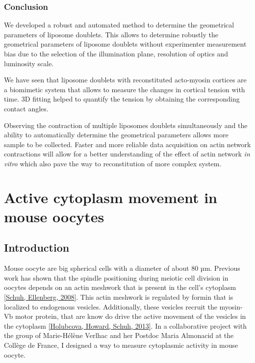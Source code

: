 \documentclass[A4paperpaper,11pt,english]{sphinxmanual}
\begin{document}
\subsection{Conclusion}
\label{index-latex:id25}
We developed a robust and automated method to determine the geometrical
parameters of liposome doublets. This allows to determine robustly the
geometrical parameters of liposome doublets without
experimenter measurement bias due to the selection of the illumination plane,
resolution of optics and luminosity scale.

We have seen that liposome doublets with reconstituted acto-myosin cortices are
a biomimetic system that allows to measure the changes in cortical tension with
time. 3D fitting helped to quantify the tension by obtaining the corresponding contact angles.

Observing the contraction of multiple liposomes doublets simultaneously and the
ability to automatically determine the geometrical parameters allows more
sample to be collected. Faster and more reliable data acquisition on actin
network contractions will allow for a better understanding of the effect of actin
network \emph{in vitro} which also pave the way to reconstitution of more complex system.


\chapter{Active cytoplasm movement in mouse oocytes}
\label{index-latex:active-cytoplasm-movement-in-mouse-oocytes}\label{index-latex::doc}

\section{Introduction}
\label{index-latex:introduction}
Mouse oocyte are big spherical cells with a diameter of about 80 µm.  Previous work has shown
that the spindle positioning during meiotic cell division in oocytes depends
on an actin meshwork that is present in the cell's cytoplasm {\hyperref[index-latex:schuh2008]{{[}Schuh, Ellenberg,  2008{]}}}.  This
actin meshwork is regulated by formin that is localized to endogenous vesicles.
Additionally, these vesicles recruit the myosin-Vb motor protein, that are know do drive the active movement
of the vesicles in the cytoplasm {\hyperref[index-latex:holubcova2013]{{[}Holubcova, Howard, Schuh,  2013{]}}}. In a collaborative project with the group of Marie-Hélène Verlhac
and her Postdoc Maria Almonacid at the Collège de France, I designed a way to measure
cytoplasmic activity in mouse oocyte.
\end{document}
